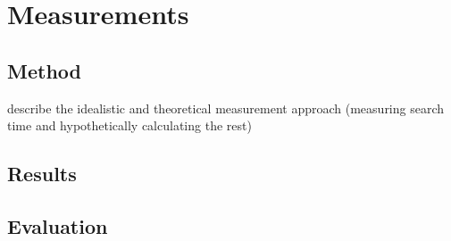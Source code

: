 
\chapter{Measurements}
\label{ch:measurements}

\section{Method}
describe the idealistic and theoretical measurement approach (measuring search time and hypothetically calculating the rest)

\section{Results}

\section{Evaluation}
